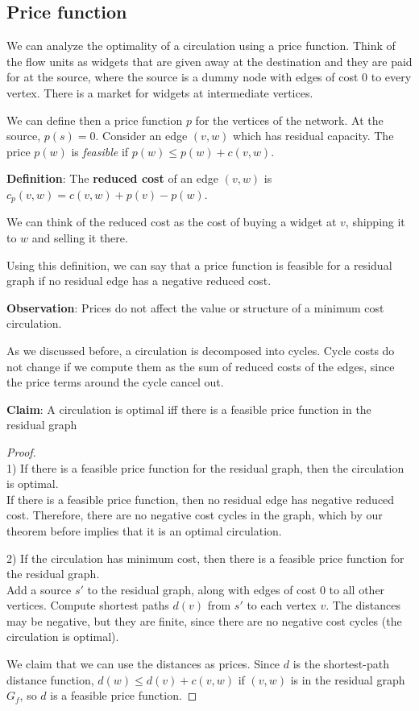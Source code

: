 \documentclass{article}
\begin{document}
\subsection{Price function}
We can analyze the optimality of a circulation using a price function. Think of the flow units as widgets that are given away at the destination and they are paid for at the source, where the source is a dummy node with edges of cost $0$ to every vertex. There is a market for widgets at intermediate vertices. 

We can define then a price function $p$ for the vertices of the network. At the source, $p(s) = 0$. Consider an edge $(v, w)$ which has residual capacity. The price $p(w)$ is \emph{feasible} if $p(w) \leq p(w) + c(v, w)$.  

\textbf{Definition}:
The {\bf reduced cost} of an edge $(v, w)$ is $c_p(v, w) = c(v, w) + p(v) - p(w)$.

We can think of the reduced cost as the cost of buying a widget at $v$, shipping it to $w$ and selling it there. 

Using this definition, we can say that a price function is feasible for a residual graph if no residual edge has a negative reduced cost. 

\textbf{Observation}:
Prices do not affect the value or structure of a minimum cost circulation.

As we discussed before, a circulation is decomposed into cycles. Cycle costs do not change if we compute them as the sum of reduced costs of the edges, since the price terms around the cycle cancel out. 

\textbf{Claim}:
A circulation is optimal iff there is a feasible price function in the residual graph

\begin{proof}\\
1) If there is a feasible price function for the residual graph, then the circulation is optimal.\\
If there is a feasible price function, then no residual edge has negative reduced cost. Therefore, there are no negative cost cycles in the graph, which by our theorem before implies that it is an optimal circulation.  

2) If the circulation has minimum cost, then there is a feasible price function for the residual graph.\\
Add a source $s'$ to the residual graph, along with edges of cost 0 to all other vertices. Compute shortest paths $d(v)$ from $s'$ to each vertex $v$. The distances may be negative, but they are finite, since there are no negative cost cycles (the circulation is optimal). 

We claim that we can use the distances as prices. Since $d$ is the shortest-path distance function, $d(w) \leq d(v) + c(v, w)$ if $(v, w)$ is in the residual graph $G_f$, so $d$ is a feasible price function.   
\end{proof} 
\end{document}
